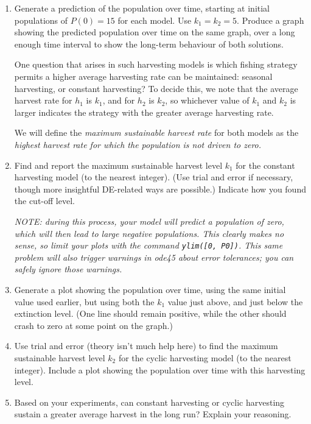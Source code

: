 \begin{enumerate}
\begin{enumerate}
\item Generate a prediction of the population over time, starting at
  initial populations of $P(0) = 15$ for each model.  Use $k_1 = k_2 =
  5$. Produce a graph showing the predicted population over time on
  the same graph, over a long enough time interval to show the
  long-term behaviour of both solutions.

\vspace{0.2in}

One question that arises in such harvesting models is which fishing
strategy permits a higher average harvesting rate can be maintained:
seasonal harvesting, or constant harvesting?  To decide this, we note
that the average harvest rate for $h_1$ is $k_1$, and for $h_2$ is
$k_2$, so whichever value of $k_1$ and $k_2$ is larger indicates the
strategy with the greater average harvesting rate.

We will define the {\em maximum sustainable harvest rate} for both
models as the {\em highest harvest rate for which the population is
  not driven to zero.}

\item Find and report the maximum sustainable harvest level $k_1$ for
  the constant harvesting model (to the nearest integer).  (Use trial
  and error if necessary, though more insightful DE-related ways are
  possible.)  Indicate how you found the cut-off level. 

  {\em NOTE: during this process, your model will predict a population
    of zero, which will then lead to large negative populations.  This
    clearly makes no sense, so limit your plots with the command
    \verb#ylim([0, P0])#.  This same problem will also trigger
    warnings in ode45 about error tolerances; you can safely ignore
    those warnings.}

\item Generate a plot showing the population over time, using the same
  initial value used earlier, but using both the $k_1$ value just
  above, and just below the extinction level. (One line should remain
  positive, while the other should crash to zero at some point on the
  graph.)

\item Use trial and error (theory isn't much help here) to find the
  maximum sustainable harvest level $k_2$ for the cyclic harvesting
  model (to the nearest integer).  Include a plot showing the
  population over time with this harvesting level.

\item Based on your experiments, can constant harvesting or cyclic
  harvesting sustain a greater average harvest in the long run?
  Explain your reasoning.
\end{enumerate}


\end{enumerate}
